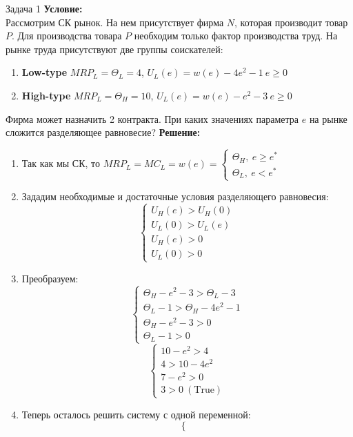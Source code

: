 \begin{mybox}{Задача 1}
    \indent\setlength{\parindent}{1em}\textbf{Условие:}\\
    \indent\setlength{\parindent}{1em}Рассмотрим СК рынок. На нем присутствует фирма $N$, которая производит товар $P$.
    Для производства товара $P$ необходим только фактор производства труд. На рынке труда присутствуют две группы
    соискателей:
    \begin{enumerate}
        \item \textbf{Low-type} $MRP_L=\Theta_L=4$, $U_L(e)=w(e)-4e^2-1 \ e\geq0$
        \item \textbf{High-type} $MRP_L=\Theta_H=10$, $U_L(e)=w(e)-e^2-3 \ e\geq0$
    \end{enumerate}
    \indent\setlength{\parindent}{1em}Фирма может назначить 2 контракта. При каких значениях параметра $e$ на рынке
    сложится разделяющее равновесие?
    \tcblower
    \textbf{Решение:}
    \begin{enumerate}
        \item Так как мы СК, то $MRP_L=MC_L=w(e)=\begin{cases}
            \Theta_H, \ e\geq e^* \\
            \Theta_L, \ e<e^*
        \end{cases}$
        \item Зададим необходимые и достаточные условия разделяющего равновесия: $$\begin{cases}
            U_H(e)>U_H(0) \\
            U_L(0)>U_L(e) \\
            U_H(e)>0 \\
            U_L(0)>0
        \end{cases}$$
        \item Преобразуем: $$\begin{cases}
            \Theta_H-e^2-3>\Theta_L-3 \\
            \Theta_L-1>\Theta_H-4e^2-1 \\
            \Theta_H-e^2-3>0 \\
            \Theta_L-1>0
        \end{cases}$$
        $$\begin{cases}
            10-e^2>4 \\
            4>10-4e^2 \\
            7-e^2>0 \\
            3>0 \ (\text{True})
        \end{cases}$$
        \item Теперь осталось решить систему с одной переменной: $$\begin{cases}

\end{cases}$$
\end{enumerate}
\end{mybox}
